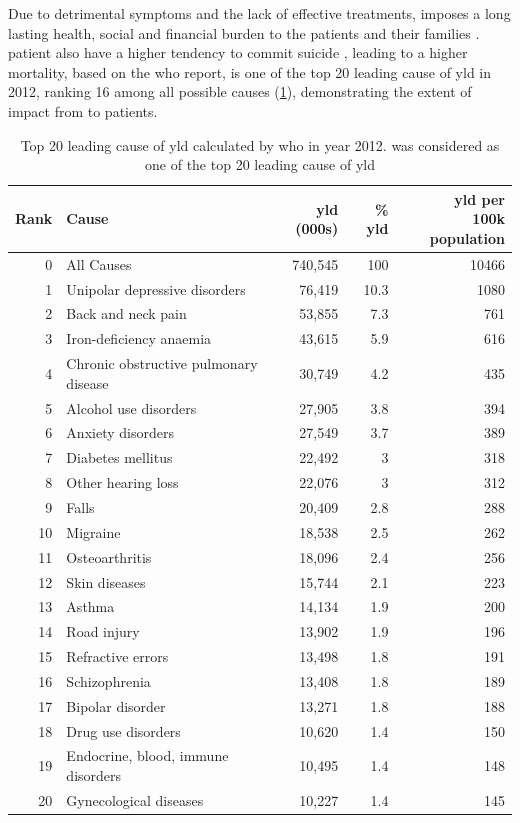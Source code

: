 	Due to detrimental symptoms and the lack of effective treatments,  imposes a long lasting health, social and financial burden to the patients and their families \citep{Knapp2004}. 
	 patient also have a higher tendency to commit suicide \citep{Saha2007}, leading to a higher mortality, based on the \gls{who} report,  is one of the top 20 leading cause of \gls{yld} in 2012, ranking 16 among all possible causes (\cref{tab:whoYLD}), demonstrating the extent of impact from  to patients.
	\begin{table}[ht]
		\centering
		\caption[Top 20 leading cause of ]{Top 20 leading cause of \gls{yld} calculated by \gls{who} in year 2012.
			 was considered as one of the top 20 leading cause of \gls{yld} \citep{Geneva2013}}
		\begin{tabular}{rp{5cm}rrr}
			\toprule
			Rank  & Cause & \gls{yld} (000s) & \% \gls{yld} & \specialcell[b]{\gls{yld} per \\100k population}\\
			\midrule
			0     & All Causes & 740,545 & 100   & 10466 \\
			1     & Unipolar depressive disorders & 76,419 & 10.3  & 1080 \\
			2     & Back and neck pain & 53,855 & 7.3   & 761 \\
			3     & Iron-deficiency anaemia & 43,615 & 5.9   & 616 \\
			4     & Chronic obstructive pulmonary disease & 30,749 & 4.2   & 435 \\
			5     & Alcohol use disorders & 27,905 & 3.8   & 394 \\
			6     & Anxiety disorders & 27,549 & 3.7   & 389 \\
			7     & Diabetes mellitus & 22,492 & 3     & 318 \\
			8     & Other hearing loss & 22,076 & 3     & 312 \\
			9     & Falls & 20,409 & 2.8   & 288 \\
			10    & Migraine & 18,538 & 2.5   & 262 \\
			11    & Osteoarthritis & 18,096 & 2.4   & 256 \\
			12    & Skin diseases & 15,744 & 2.1   & 223 \\
			13    & Asthma & 14,134 & 1.9   & 200 \\
			14    & Road injury & 13,902 & 1.9   & 196 \\
			15    & Refractive errors & 13,498 & 1.8   & 191 \\
			16    & Schizophrenia & 13,408 & 1.8   & 189 \\
			17    & Bipolar disorder & 13,271 & 1.8   & 188 \\
			18    & Drug use disorders & 10,620 & 1.4   & 150 \\
			19    & Endocrine, blood, immune disorders & 10,495 & 1.4   & 148 \\
			20    & Gynecological diseases & 10,227 & 1.4   & 145 \\
			\bottomrule
		\end{tabular}%
		\label{tab:whoYLD}%
	\end{table}%
